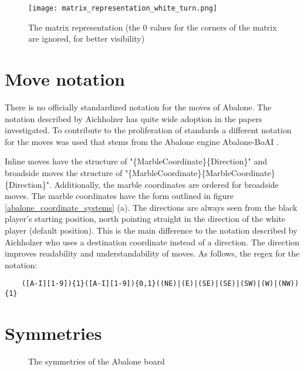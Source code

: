 \begin{figure}[!h]
    \centering
    \texttt{[image: matrix\_representation\_white\_turn.png]}
    \caption{The matrix representation (the $0$ values for the corners of the matrix are ignored, for better visibility)}
    \label{abalone_matrix_representation}
\end{figure}

\section{Move notation}
There is no officially standardized notation for the moves of Abalone. The notation described by Aichholzer \cite{aichholzer_abalone_2006} has quite wide adoption in the papers investigated. To contribute to the proliferation of standards \cite{xkcd_standards_nodate} a different notation for the moves was used that stems from the Abalone engine Abalone-BoAI \cite{scriptim_scriptimabalone-boai_2021}.

Inline moves have the structure of "\{MarbleCoordinate\}\{Direction\}" and broadside moves the structure of "\{MarbleCoordinate\}\{MarbleCoordinate\}\{Direction\}". Additionally, the marble coordinates are ordered for broadside moves. The marble coordinates have the form outlined in figure \ref{abalone_coordinate_systems} (a). The directions are always seen from the black player's starting position, north pointing straight in the direction of the white player (default position). This is the main difference to the notation described by Aichholzer who uses a destination coordinate instead of a direction. The direction improves readability and understandability of moves. As follows, the regex for the notation:

\begin{BVerbatim}
    ([A-I][1-9]){1}([A-I][1-9]){0,1}((NE)|(E)|(SE)|(SE)|(SW)|(W)|(NW)){1}
\end{BVerbatim}

\section{Symmetries}
\label{abalone_symmetries}

\begin{figure}
    \centering
    \caption{The symmetries of the Abalone board}
    \label{abalone_symmetries_figure}
\end{figure}

